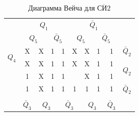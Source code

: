 \documentclass[a4paper,14pt]{article}
\begin{document}
\begin{table}[H]
	\begin{center}
		\caption{\label{tab:SN2_tab} Диаграмма Вейча для $\overline{\text{СИ}2}$ }
		\begin{tabular}{cccccccccc}
			& \multicolumn{4}{c}{$Q_1$} & \multicolumn{4}{c}{$\bar{Q}_1$} &  \\
			& \multicolumn{2}{c}{$Q_5$} & \multicolumn{2}{c}{$\bar{Q}_5$} & \multicolumn{2}{c}{$Q_5$} & \multicolumn{2}{c}{$\bar{Q}_5$} &  \\ \cline{2-9}
			\multicolumn{1}{c|}{\multirow{2}{*}{$Q_4$}} & \multicolumn{1}{c|}{X} & \multicolumn{1}{c|}{X} & \multicolumn{1}{c|}{1} & \multicolumn{1}{c|}{1} & \multicolumn{1}{c|}{X} & \multicolumn{1}{c|}{X} & \multicolumn{1}{c|}{1} & \multicolumn{1}{c|}{1} & $\bar{Q}_2$ \\ \cline{2-9}
			\multicolumn{1}{c|}{} & \multicolumn{1}{c|}{X} & \multicolumn{1}{c|}{X} & \multicolumn{1}{c|}{1} & \multicolumn{1}{c|}{1} & \multicolumn{1}{c|}{X} & \multicolumn{1}{c|}{X} & \multicolumn{1}{c|}{1} & \multicolumn{1}{c|}{1} & \multirow{2}{*}{$Q_2$} \\ \cline{2-9}
			\multicolumn{1}{c|}{\multirow{2}{*}{}} & \multicolumn{1}{c|}{1} & \multicolumn{1}{c|}{X} & \multicolumn{1}{c|}{1} & \multicolumn{1}{c|}{1} & \multicolumn{1}{c|}{} & \multicolumn{1}{c|}{X} & \multicolumn{1}{c|}{1} & \multicolumn{1}{c|}{1} &  \\ \cline{2-9}
			\multicolumn{1}{c|}{} & \multicolumn{1}{c|}{1} & \multicolumn{1}{c|}{X} & \multicolumn{1}{c|}{1} & \multicolumn{1}{c|}{1} & \multicolumn{1}{c|}{1} & \multicolumn{1}{c|}{1} & \multicolumn{1}{c|}{1} & \multicolumn{1}{c|}{1} & $\bar{Q}_2$ \\ \cline{2-9}
			&  & \multicolumn{2}{c}{} & \multicolumn{2}{c}{} & \multicolumn{2}{c}{} &  &  \\
			& $\bar{Q}_3$ & \multicolumn{2}{c}{$Q_3$} & \multicolumn{2}{c}{$\bar{Q}_3$} & \multicolumn{2}{c}{$Q_3$} & $\bar{Q}_3$ & 
		\end{tabular}
	\end{center}
\end{table}

\end{document}
